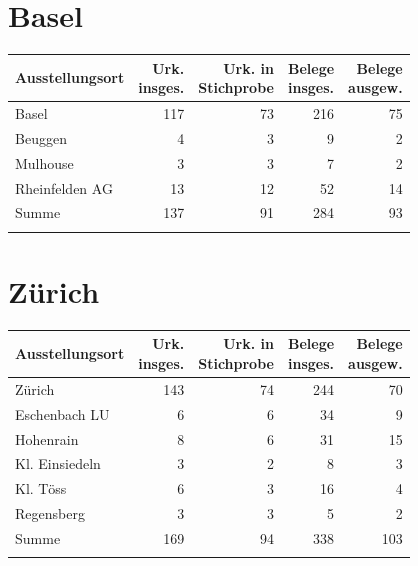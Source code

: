 \section{Basel}

\begin{tabularx}{\linewidth}{X r r r r}
\lsptoprule
Ausstellungsort
	& \makecell{Urk.\\ insges.}
	& \makecell{Urk. in\\ Stichprobe}
	& \makecell{Belege\\ insges.}
	& \makecell{Belege\\ ausgew.}
	\\
\midrule

Basel
	& 117
	& 73
	& 216
	& 75
	\\

Beuggen
	& 4
	& 3
	& 9
	& 2
	\\

Mulhouse
	& 3
	& 3
	& 7
	& 2
	\\

Rheinfelden AG
	& 13
	& 12
	& 52
	& 14
	\\

\midrule

Summe
	& 137
	& 91
	& 284
	& 93
	\\

\lspbottomrule
\end{tabularx}

\section{Zürich}

\begin{tabularx}{\linewidth}{X r r r r}
\lsptoprule
Ausstellungsort
	& \makecell{Urk.\\ insges.}
	& \makecell{Urk. in\\ Stichprobe}
	& \makecell{Belege\\ insges.}
	& \makecell{Belege\\ ausgew.}
	\\
\midrule

Zürich
	& 143
	& 74
	& 244
	& 70
	\\

Eschenbach LU
	& 6
	& 6
	& 34
	& 9
	\\

Hohenrain
	& 8
	& 6
	& 31
	& 15
	\\

Kl. Einsiedeln
	& 3
	& 2
	& 8
	& 3
	\\

Kl. Töss
	& 6
	& 3
	& 16
	& 4
	\\

Regensberg
	& 3
	& 3
	& 5
	& 2
	\\

\midrule

Summe
	& 169
	& 94
	& 338
	& 103
	\\

\lspbottomrule
\end{tabularx}

